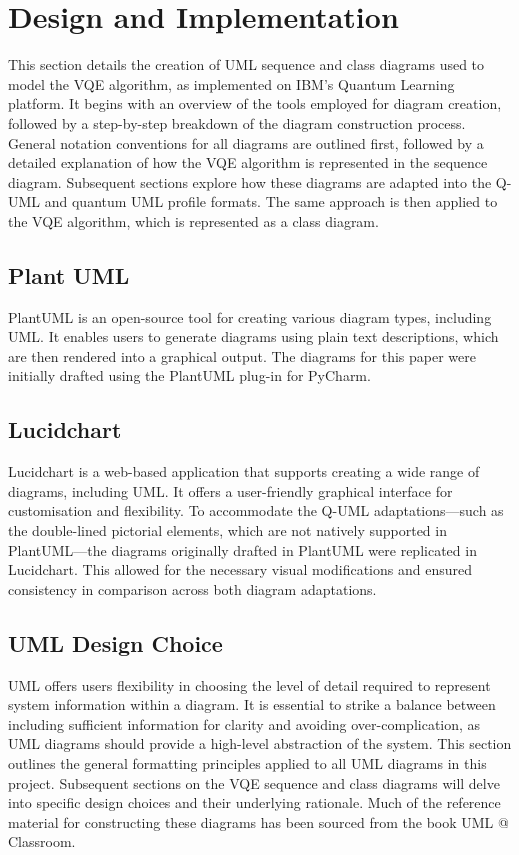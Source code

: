 \documentclass{article}
\begin{document}
\section{Design and Implementation}

This section details the creation of UML sequence and class diagrams used to model the VQE algorithm, as implemented on IBM's Quantum Learning platform. It begins with an overview of the tools employed for diagram creation, followed by a step-by-step breakdown of the diagram construction process. General notation conventions for all diagrams are outlined first, followed by a detailed explanation of how the VQE algorithm is represented in the sequence diagram. Subsequent sections explore how these diagrams are adapted into the Q-UML and quantum UML profile formats. The same approach is then applied to the VQE algorithm, which is represented as a class diagram.

\subsection{Plant UML}

PlantUML is an open-source tool for creating various diagram types, including UML. It enables users to generate diagrams using plain text descriptions, which are then rendered into a graphical output\cite{PUML}\cite{PUMLWIKI}. The diagrams for this paper were initially drafted using the PlantUML plug-in for PyCharm.

\subsection{Lucidchart}

Lucidchart is a web-based application that supports creating a wide range of diagrams, including UML. It offers a user-friendly graphical interface for customisation and flexibility. To accommodate the Q-UML adaptations—such as the double-lined pictorial elements, which are not natively supported in PlantUML—the diagrams originally drafted in PlantUML were replicated in Lucidchart. This allowed for the necessary visual modifications and ensured consistency in comparison across both diagram adaptations.

\subsection{UML Design Choice}

UML offers users flexibility in choosing the level of detail required to represent system information within a diagram. It is essential to strike a balance between including sufficient information for clarity and avoiding over-complication, as UML diagrams should provide a high-level abstraction of the system. This section outlines the general formatting principles applied to all UML diagrams in this project. Subsequent sections on the VQE sequence and class diagrams will delve into specific design choices and their underlying rationale. Much of the reference material for constructing these diagrams has been sourced from the book UML @ Classroom\cite{Seidl_Scholz_Huemer_Kappel_Duffy_2014}. 
\end{document}
